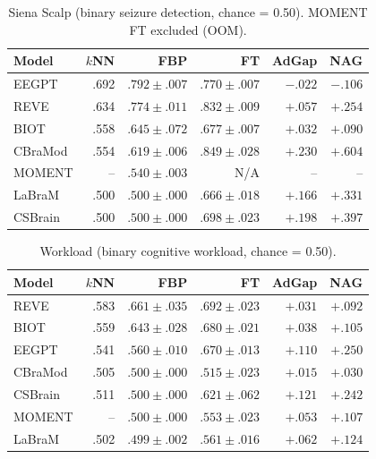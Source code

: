 \documentclass{article}
\begin{document}
\begin{table}[h]
  \caption{Siena Scalp (binary seizure detection, chance = 0.50). MOMENT FT excluded (OOM).}
  \centering\small
  \begin{tabular}{lrrrrr}
    \toprule
    Model & $k$NN & FBP & FT & AdGap & NAG \\
    \midrule
    EEGPT & .692 & $.792 \pm .007$ & $.770 \pm .007$ & $-.022$ & $-.106$ \\
    REVE & .634 & $.774 \pm .011$ & $.832 \pm .009$ & $+.057$ & $+.254$ \\
    BIOT & .558 & $.645 \pm .072$ & $.677 \pm .007$ & $+.032$ & $+.090$ \\
    CBraMod & .554 & $.619 \pm .006$ & $\mathbf{.849} \pm .028$ & $+.230$ & $+.604$ \\
    MOMENT & -- & $.540 \pm .003$ & N/A & -- & -- \\
    LaBraM & .500 & $.500 \pm .000$ & $.666 \pm .018$ & $+.166$ & $+.331$ \\
    CSBrain & .500 & $.500 \pm .000$ & $.698 \pm .023$ & $+.198$ & $+.397$ \\
    \bottomrule
  \end{tabular}
\end{table}

\begin{table}[h]
  \caption{Workload (binary cognitive workload, chance = 0.50).}
  \centering\small
  \begin{tabular}{lrrrrr}
    \toprule
    Model & $k$NN & FBP & FT & AdGap & NAG \\
    \midrule
    REVE & .583 & $.661 \pm .035$ & $\mathbf{.692} \pm .023$ & $+.031$ & $+.092$ \\
    BIOT & .559 & $.643 \pm .028$ & $.680 \pm .021$ & $+.038$ & $+.105$ \\
    EEGPT & .541 & $.560 \pm .010$ & $.670 \pm .013$ & $+.110$ & $+.250$ \\
    CBraMod & .505 & $.500 \pm .000$ & $.515 \pm .023$ & $+.015$ & $+.030$ \\
    CSBrain & .511 & $.500 \pm .000$ & $.621 \pm .062$ & $+.121$ & $+.242$ \\
    MOMENT & -- & $.500 \pm .000$ & $.553 \pm .023$ & $+.053$ & $+.107$ \\
    LaBraM & .502 & $.499 \pm .002$ & $.561 \pm .016$ & $+.062$ & $+.124$ \\
    \bottomrule
  \end{tabular}
\end{table}
\end{document}
